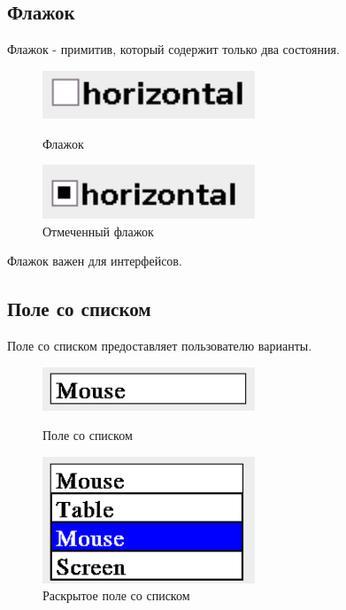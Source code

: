 \documentclass[14pt]{extarticle}
\begin{document}
	\subsection{Флажок}
	Флажок - примитив, который содержит только два состояния.
		\begin{figure}[h]
		\begin{center}
		\begin{minipage}[h]{0.4\linewidth}
		\includegraphics[width=180pt]{pictures/checkBox1.png}
		\caption{Флажок} %
		\label{ris:b1} %
		\end{minipage}
		\hfill 
		\begin{minipage}[h]{0.4\linewidth}
		\includegraphics[width=180pt]{pictures/checkBox2.png}
		\caption{Отмеченный флажок}
		\label{ris:b2}
		\end{minipage}
		\end{center}
		\end{figure}	
			
	Флажок важен для интерфейсов.	
		
	\pagebreak		
	\subsection{Поле со списком}
	Поле со списком предоставляет пользователю варианты.
	
		\begin{figure}[h]
		\begin{center}
		\begin{minipage}[h]{0.4\linewidth}
		\includegraphics[width=180pt]{pictures/comboBox1.png}
		\caption{ Поле со списком} %
		\label{ris:b1} %
		\end{minipage}
		\hfill 
		\begin{minipage}[h]{0.4\linewidth}
		\includegraphics[width=180pt]{pictures/comboBox2.png}
		\caption{Раскрытое поле со списком}
		\label{ris:b2}
		\end{minipage}
		\end{center}
		\end{figure}
		
\end{document}
